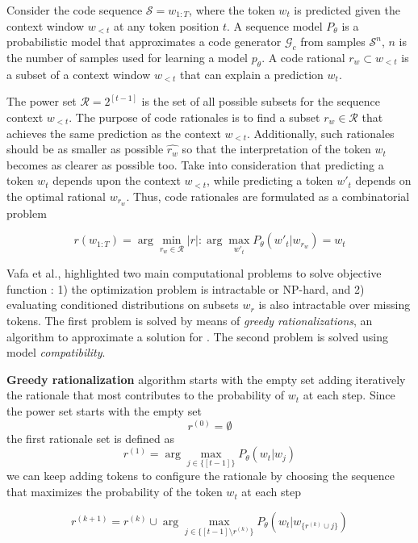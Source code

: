 Consider the code sequence  $\mathcal{S} = w_{1:T}$, where the token $w_t$ is predicted given the context window $w_{<t}$ at any token position $t$. A sequence model $P_{\theta}$ is a probabilistic model that approximates a code generator $\mathcal{G}_c$ from samples $\mathcal{S}^n$, $n$ is the number of samples used for learning a model $p_{\theta}$. A code rational $r_w \subset w_{<t} $ is a subset of a context window $w_{<t}$ that can explain a prediction $w_t$.

The power set $\mathcal{R} = 2^{[t-1]}$ is the set of all possible subsets for the sequence context $w_{<t}$. The purpose of code rationales is to find a subset $r_w \in \mathcal{R}$ that achieves the same prediction as the context $w_{<t}$. Additionally, such rationales should be as smaller as possible $\hat{r_w}$ so that the interpretation of the token $w_t$ becomes as clearer as possible too. Take into consideration that predicting a token $w_t$ depends upon the context $w_{<t}$, while predicting a token $w'_t$ depends on the optimal rational $w_{r_w}$. Thus, code rationales are formulated as a combinatorial problem

\begin{equation}
r(w_{1:T}) = \arg \min_{r_w \in \mathcal{R}} |r| : \arg \max_{w'_t} P_{\theta}(w'_t|w_{r_w}) = w_t
\label{eq:combinatorial}
\end{equation}


Vafa et al., highlighted two main computational problems to solve objective function : 1) the optimization problem is intractable or NP-hard, and 2) evaluating conditioned distributions on subsets $w_r$ is also intractable over missing tokens. The first problem is solved by means of \textit{greedy rationalizations}, an algorithm to approximate a solution for . The second problem is solved using model \textit{compatibility}.

\textbf{Greedy rationalization} algorithm starts with the empty set adding iteratively the rationale that most contributes to the probability of $w_t$ at each step. Since the power set starts with the empty set 
$$r^{(0)}=\emptyset$$
the first rationale set is defined as
$$r^{(1)} = \arg \max_{j \in \{ [t-1] \} } P_{\theta}(w_t|w_j)$$
we can keep adding tokens to configure the rationale by choosing the sequence that maximizes the probability of the token $w_t$ at each step

\begin{equation}
r^{(k+1)} = r^{(k)} \cup  \arg \max_{j \in \{[t-1] \setminus r^{(k)} \} } P_{\theta}(w_t|w_{ \{ r^{(k)}\cup j \} })
\label{eq:greedy}
\end{equation}

